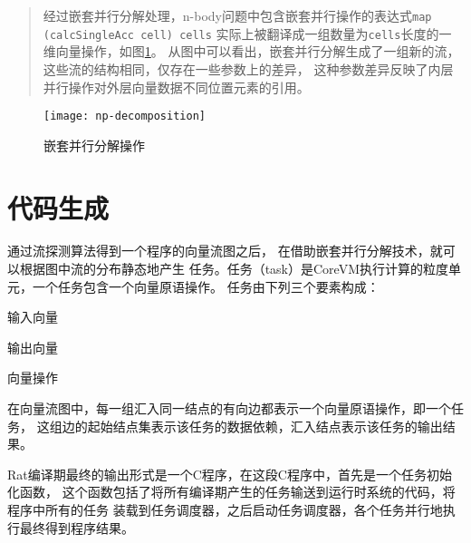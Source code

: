 \begin{quotation}
  经过嵌套并行分解处理，n-body问题中包含嵌套并行操作的表达式\texttt{map (calcSingleAcc cell) cells}
  实际上被翻译成一组数量为\texttt{cells}长度的一维向量操作，如图\ref{fig:np-decomposition}。
  从图中可以看出，嵌套并行分解生成了一组新的流，这些流的结构相同，仅存在一些参数上的差异，
  这种参数差异反映了内层并行操作对外层向量数据不同位置元素的引用。
\end{quotation}
\begin{figure}
  \centering
  \texttt{[image: np-decomposition]}
  \caption{嵌套并行分解操作}
  \label{fig:np-decomposition}
\end{figure}



\section{代码生成}\label{sec:code-generation}
通过流探测算法得到一个程序的向量流图之后，
在借助嵌套并行分解技术，就可以根据图中流的分布静态地产生
任务。任务（task）是CoreVM执行计算的粒度单元，一个任务包含一个向量原语操作。
任务由下列三个要素构成：
\begin{compactitem}
  \item 输入向量
  \item 输出向量
  \item 向量操作
\end{compactitem}
在向量流图中，每一组汇入同一结点的有向边都表示一个向量原语操作，即一个任务，
这组边的起始结点集表示该任务的数据依赖，汇入结点表示该任务的输出结果。

Rat编译期最终的输出形式是一个C程序，在这段C程序中，首先是一个任务初始化函数，
这个函数包括了将所有编译期产生的任务输送到运行时系统的代码，将程序中所有的任务
装载到任务调度器，之后启动任务调度器，各个任务并行地执行最终得到程序结果。

